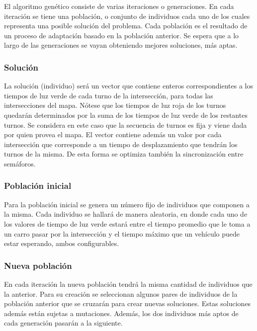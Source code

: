 \documentclass[colorinlistoftodos,twoside,twocolumn]{article} %
\begin{document}
	El algoritmo gen\'etico consiste de varias iteraciones o generaciones. En cada iteraci\'on se tiene una poblaci\'on, o conjunto de individuos cada uno de los cuales representa una posible soluci\'on del problema. Cada poblaci\'on es el resultado de un proceso de adaptaci\'on basado en la poblaci\'on anterior. Se espera que a lo largo de las generaciones se vayan obteniendo mejores soluciones, m\'as aptas.
	
	\subsubsection{Solución}
	
	La solución (individuo) será un vector que contiene enteros correspondientes a los tiempos de luz verde de cada turno de la intersección, para todas las intersecciones del mapa. N\'otese que los tiempos de luz roja de los turnos quedar\'an determinados por la suma de los tiempos de luz verde de los restantes turnos. Se considera en este caso que la secuencia de turnos es fija y viene dada por quien provea el mapa. El vector contiene adem\'as un valor por cada intersecci\'on que corresponde a un tiempo de desplazamiento que tendr\'an los turnos de la misma. De esta forma se optimiza tambi\'en la sincronizaci\'on entre sem\'aforos. 
	
	\subsubsection{Población inicial}
	
	Para  la población inicial se genera un n\'umero fijo de individuos que componen a la misma. Cada individuo se hallará de manera aleatoria, en donde cada uno de los valores de tiempo de luz verde estará entre el tiempo promedio que le toma a un carro pasar por la intersección y el tiempo máximo que un vehículo puede estar esperando, ambos configurables. 
	
	\subsubsection{Nueva población}
	En cada iteraci\'on la nueva poblaci\'on tendr\'a la misma cantidad de individuos que la anterior. Para su creaci\'on se seleccionan algunos pares de individuos de la poblaci\'on anterior que se cruzar\'an para crear nuevas soluciones. Estas soluciones adem\'as est\'an sujetas a mutaciones. Adem\'as, los dos individuos m\'as aptos de cada generaci\'on pasar\'an a la siguiente.  
	
\end{document}
